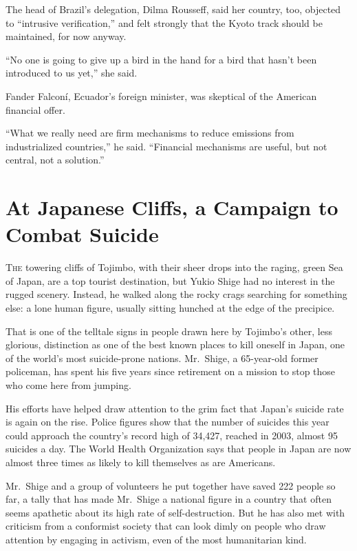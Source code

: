 ﻿\documentclass[12pt]{article}
\begin{document}
The head of Brazil's delegation, Dilma Rousseff, said her country, too, objected to ``intrusive
verification,'' and felt strongly that the Kyoto track should be maintained, for now anyway.

``No one is going to give up a bird in the hand for a bird that hasn't been introduced to us yet,''
she said.

Fander Falconí, Ecuador's foreign minister, was skeptical of the American financial offer.

``What we really need are firm mechanisms to reduce emissions from industrialized countries,'' he
said. ``Financial mechanisms are useful, but not central, not a solution.''

\section{At Japanese Cliffs, a Campaign to Combat Suicide}

\lettrine{T}{he} towering cliffs of Tojimbo, with their sheer drops into the
raging, green Sea of Japan, are a top tourist destination, but Yukio Shige had no interest in the
rugged scenery. Instead, he walked along the rocky crags searching for something else: a lone human
figure, usually sitting hunched at the edge of the precipice.

That is one of the telltale signs in people drawn here by Tojimbo's other, less glorious,
distinction as one of the best known places to kill oneself in Japan, one of the world's most
suicide-prone nations. Mr.~Shige, a 65-year-old former policeman, has spent his five years since
retirement on a mission to stop those who come here from jumping.

His efforts have helped draw attention to the grim fact that Japan's suicide rate is again on the
rise. Police figures show that the number of suicides this year could approach the country's record
high of 34,427, reached in 2003, almost 95 suicides a day. The World Health Organization says that
people in Japan are now almost three times as likely to kill themselves as are Americans.

Mr.~Shige and a group of volunteers he put together have saved 222 people so far, a tally that has
made Mr.~Shige a national figure in a country that often seems apathetic about its high rate of
self-destruction. But he has also met with criticism from a conformist society that can look dimly
on people who draw attention by engaging in activism, even of the most humanitarian kind.
\end{document}
